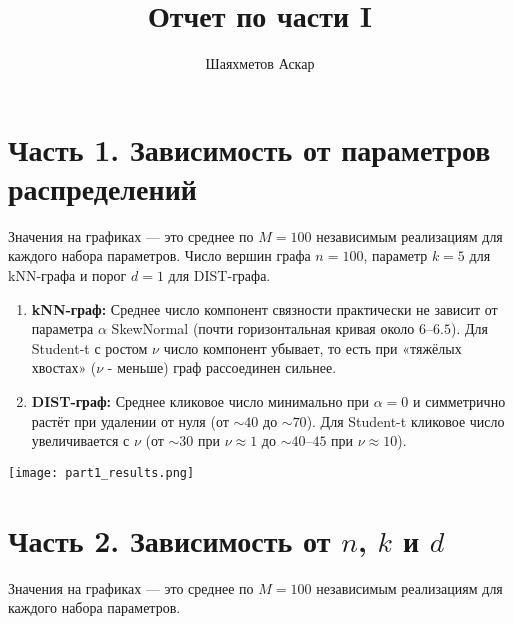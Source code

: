 \documentclass[12pt,a4paper]{article}
\title{Отчет по части I}
\author{Шаяхметов Аскар}
\date{} %
\begin{document}
\maketitle

\section*{Часть 1. Зависимость от параметров распределений}
\vspace{-1em}
\noindent
Значения на графиках — это среднее по $M=100$ независимым реализациям для каждого набора параметров. Число вершин графа $n=100$, параметр $k=5$ для kNN-графа и порог $d=1$ для DIST-графа.

\begin{enumerate}
  \item \textbf{kNN-граф:} Среднее число компонент связности практически не зависит от параметра $\alpha$ SkewNormal (почти горизонтальная кривая около $6$–$6.5$). Для Student-t с ростом $\nu$ число компонент убывает, то есть при «тяжёлых хвостах» ($\nu$ - меньше) граф рассоединен сильнее.

  \item \textbf{DIST-граф:} Среднее кликовое число минимально при $\alpha=0$ и симметрично растёт при удалении от нуля (от $\sim40$ до $\sim70$). Для Student-t кликовое число увеличивается с $\nu$ (от $\sim30$ при $\nu\approx1$ до $\sim40$–$45$ при $\nu\approx10$).
\end{enumerate}

\begin{center}
  \texttt{[image: part1\_results.png]}
\end{center}
\newpage
\section*{Часть 2. Зависимость от $n$, $k$ и $d$}
\vspace{-1em}
\noindent
Значения на графиках — это среднее по $M=100$ независимым реализациям для каждого набора параметров.
\end{document}
